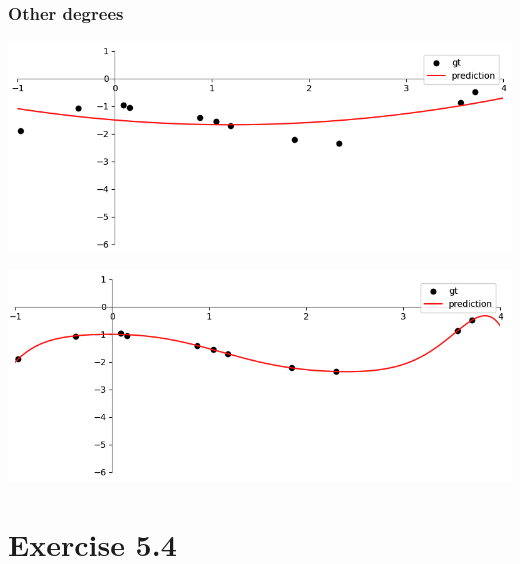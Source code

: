 \documentclass[10pt,aspectratio=169,handout]{beamer}
\begin{document}
\begin{frame}
    \frametitle{Other degrees}

    \begin{minipage}{0.49\textwidth}
        \includegraphics[width=\textwidth]{images/task5-3-d2.png}
    \end{minipage}
    \begin{minipage}{0.49\textwidth}
        \includegraphics[width=\textwidth]{images/task5-3-d9.png}
    \end{minipage}

\end{frame}

\section{Exercise 5.4}
\end{document}
